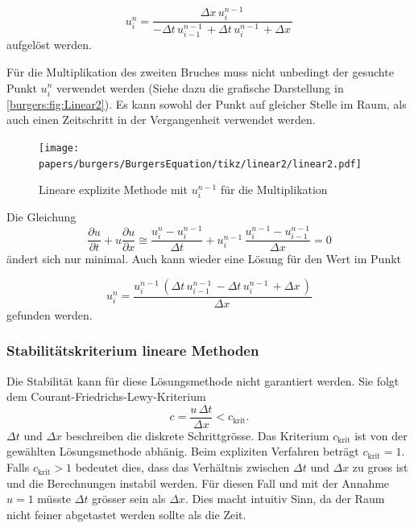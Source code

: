 	  	\begin{equation}
	  u_{i}^{n} = \frac{\Delta{x}\, u^{n-1}_{i}\,}{- \Delta{t}\, u^{n-1}_{i-1}\, + \Delta{t}\, u^{n-1}_{i}\, + \Delta{x}\,}
		  \label{burgers:eq_ex_sol_lin1}
	\end{equation}
 	aufgelöst werden.

\medskip

	Für die Multiplikation des zweiten Bruches muss nicht unbedingt der gesuchte Punkt $u_{i}^{n}$ verwendet werden (Siehe dazu die grafische Darstellung in \autoref{burgers:fig:Linear2}).
	Es kann sowohl der Punkt auf gleicher Stelle im Raum, als auch einen Zeitschritt in der Vergangenheit verwendet werden.


     \begin{figure}
	\centering
	\texttt{[image: papers/burgers/BurgersEquation/tikz/linear2/linear2.pdf]}
	\caption{Lineare explizite Methode mit  $u_{i}^{n-1}$ f\"ur die Multiplikation}
	\label{burgers:fig:Linear2}
	\end{figure}
	Die Gleichung
	\begin{equation}
			\frac {\partial u}{\partial t}+u{\frac {\partial u}{\partial x}} \cong \frac{u_{i}^{n}-u_{i}^{n-1}}{\Delta t}+ u_{i}^{n-1}\, \frac{u_{i}^{n-1}-u_{i-1}^{n-1}}{\Delta x}=0
		\label{burgers:eq_ex_lin2}
	\end{equation}
	ändert sich nur minimal.
	 Auch kann wieder eine Lösung für den Wert im Punkt

	\begin{equation}
		u_{i}^{n} = \frac{u^{n-1}_{i}\, \left(\Delta{t}\, u^{n-1}_{i-1}\, - \Delta{t}\, u^{n-1}_{i}\, + \Delta{x}\,\right)}{\Delta{x}\,}
    	\label{burgers:eq_ex_sol_lin2}
	\end{equation}
gefunden werden.

\subsubsection{Stabilit\"atskriterium lineare Methoden}
	Die Stabilit\"at kann f\"ur diese L\"osungsmethode nicht garantiert werden.
	Sie folgt dem Courant-Friedrichs-Lewy-Kriterium
%
	\begin{equation}
		  c = \frac{u \, \Delta t}{\Delta x} < c_{\text{krit}}.
	\end{equation}
	$ \Delta t$ und $\Delta x$  beschreiben die diskrete Schrittgr\"osse.
	Das Kriterium $c_{\text{krit}}$ ist von der gew\"ahlten L\"osungsmethode abh\"anig.
	Beim expliziten Verfahren beträgt $c_{\text{krit}} = 1$.
	Falls $c_{\text{krit}} > 1$ bedeutet dies, dass das Verh\"altnis zwischen $ \Delta t$ und $\Delta x$ zu gross ist und die Berechnungen instabil werden.
	F\"ur diesen Fall und mit der Annahme $u = 1$ m\"usste $ \Delta t$ gr\"osser sein als $\Delta x$.
	Dies macht intuitiv Sinn, da der Raum nicht feiner abgetastet werden sollte als die Zeit.



